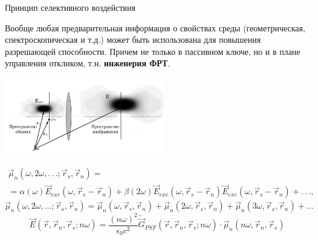 \documentclass[9pt, compress, xcolor=table]{beamer}
\begin{document}
\begin{frame}{Принцип селективного воздействия}

{\small Вообще любая предварительная информация о свойствах среды (геометрическая, спектроскопическая и т.д.) может быть использована для повышения разрешающей способности. Причем не только в пассивном ключе, но и в плане управления откликом, т.н. \textcolor{red!50!black}{\textbf{инженерия ФРТ}}.}

\begin{center}
\includegraphics[width=7cm]{fig4_04}
\end{center}
\begin{multline*}
\vec \mu_n (\omega, 2\omega, .\,.\,.; \vec r_s, \vec r_n) = \\=\alpha (\omega) \vec E_{exc}
(\omega, \vec r_s - \vec r_n) + \beta (2\omega) \vec E_{exc} (\omega, \vec r_s - \vec
r_n)\vec E_{exc} (\omega, \vec r_s - \vec r_n) + .\,.\,.,
\end{multline*}
\begin{equation*}
\vec \mu_n (\omega, 2\omega, \ldots; \vec r_s, \vec r_n) = \vec \mu_n (\omega, \vec r_s, \vec r_n)
+ \vec \mu_n (2\omega, \vec r_s, \vec r_n) + \vec \mu_n (3\omega, \vec r_s, \vec r_n) + \ldots
\end{equation*}
\begin{equation*}
\vec E(\vec r, \vec r_n, \vec r_s; n\omega) = \frac{(n \omega)^2}{\epsilon_0 c^2} \overleftrightarrow{\vec G}_{PSF}(\vec r, \vec r_n, \vec r_s; n\omega)
\cdot \vec \mu_n (n\omega, \vec r_n, \vec r_s)
\end{equation*}

\end{frame}

\end{document}
